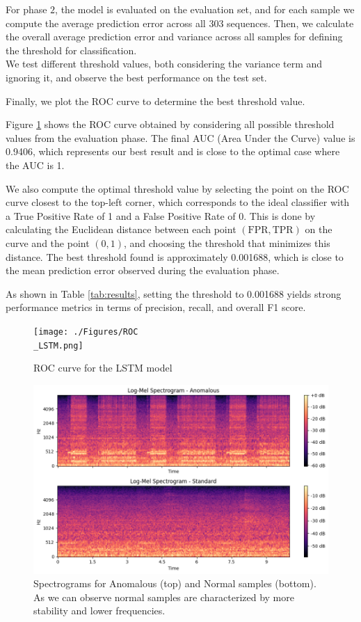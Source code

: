 \documentclass[ngerman]{scrartcl}
\begin{document}
For phase \(2\), the model is evaluated on the evaluation set, and for each sample we compute the average prediction error across all 303 sequences.
Then, we calculate the overall average prediction error and variance across all samples for defining the threshold for classification. \\We test different threshold values, both considering the variance term and ignoring it, and observe the best performance on the test set.

Finally, we plot the ROC curve to determine the best threshold value.

Figure \ref{fig:rocLSTM} shows the ROC curve obtained by considering all possible threshold values from the evaluation phase. The final AUC (Area Under the Curve) value is 0.9406, which represents our best result and is close to the optimal case where the AUC is 1.

We also compute the optimal threshold value by selecting the point on the ROC curve closest to the top-left corner, which corresponds to the ideal classifier with a True Positive Rate of 1 and a False Positive Rate of 0. 
This is done by calculating the Euclidean distance between each point \((\text{FPR}, \text{TPR})\) on the curve and the point \((0, 1)\), and choosing the threshold that minimizes this distance. 
The best threshold found is approximately 0.001688, which is close to the mean prediction error observed during the evaluation phase.


As shown in Table \ref{tab:results}, setting the threshold to 0.001688 yields strong performance metrics in terms of precision, recall, and overall F1 score.

\begin{figure}[h]
    \centering
    \texttt{[image: ./Figures/ROC\\\_LSTM.png]}
    \caption{ROC curve for the LSTM model}
    \label{fig:rocLSTM}
\end{figure}

\begin{figure}[h]
    \centering
    \includegraphics[width=.5\textwidth]{./Figures/spectograms.png}
    \caption{Spectrograms for Anomalous (top) and Normal samples (bottom). As we can observe normal samples are characterized by more stability and lower frequencies.}
    \label{fig:spectograms}
\end{figure}
\end{document}
